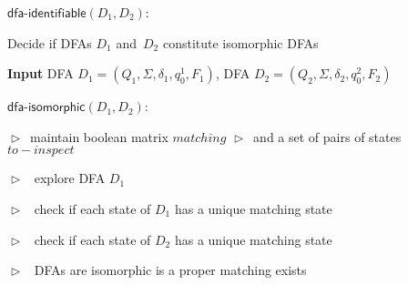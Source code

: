 \documentclass[11pt]{article}
\newcommand{\MyComment}{\State $\vartriangleright$\ }
\begin{document}
$\textsf{dfa-identifiable}(D_1,D_2)$:
\begin{algorithm}
\small
\caption{Decide if DFAs $D_1$ and~$D_2$ constitute isomorphic DFAs}
\vspace*{1.0ex}
{\textbf{Input}} 
DFA $D_1 = (Q_1, \Sigma, \delta_1, q^1_0, F_1)$, DFA $D_2 = (Q_2, \Sigma, \delta_2, q^2_0, F_2)$

\vspace*{1.0ex}

$\textsf{dfa-isomorphic}(D_1,D_2)$:
\begin{algorithmic}[1]
\MyComment maintain boolean matrix $\mathit{matching}$
\MyComment and a set of pairs of states $\mathit{to-inspect}$

\vspace*{1.0ex}

\EndFor

\vspace*{1.0ex}

\Else
\State {}
\EndIf

\vspace*{1.0ex}

\MyComment{ explore DFA $D_1$ }
\Else
{}
\EndIf
\EndIf
\EndFor
\EndWhile

\vspace*{1.0ex}

\MyComment{ check if each state of $D_1$ has a unique matching state }
\EndIf
\EndFor
{}
\EndIf
\EndFor

\vspace*{1.0ex}

\MyComment{ check if each state of $D_2$ has a unique matching state }
\EndIf
\EndFor
{}
\EndIf
\EndFor

\vspace*{1.0ex}

\MyComment{ DFAs are isomorphic is a proper matching exists }
\end{algorithmic}
\end{algorithm}
\end{document}
